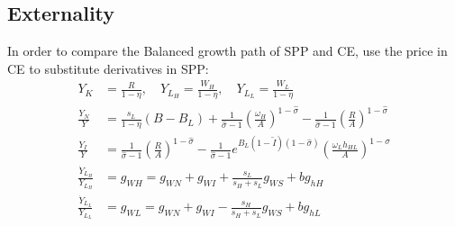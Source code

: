 \documentclass[12pt]{article}
\begin{document}
\subsection{Externality}
In order to compare the Balanced growth path of SPP and CE, use the price in CE to substitute derivatives in SPP: 
\begin{align*}
Y_K &= \frac{R}{1-\eta}, \quad Y_{L_H}= \frac{W_H}{1-\eta}, \quad Y_{L_L}= \frac{W_L}{1-\eta} \\
\frac{Y_{N}}{Y} &=\frac{s_L}{1-\eta}(B-B_L)+\frac{1}{\hat{\sigma}-1}(\frac{\omega_H}{A})^{1-\hat{\sigma}}-\frac{1}{\hat{\sigma}-1}(\frac{R}{A})^{1-\hat{\sigma}} \\
\frac{Y_{I}}{Y} &=\frac{1}{\hat{\sigma}-1}(\frac{R}{A})^{1-\hat{\sigma}}-\frac{1}{\hat{\sigma}-1}e^{B_L(1-\tilde{I})(1-\hat{\sigma})}(\frac{\omega_Lh_{HL}}{A})^{1-\hat{\sigma}} \\
\frac{\dot{Y}_{L_H}}{Y_{L_H}} &= g_{WH} = g_{WN}+g_{WI}+\frac{s_L}{s_H+s_L}g_{WS} +bg_{hH}\\
\frac{\dot{Y}_{L_L}}{Y_{L_L}} &= g_{WL} = g_{WN}+g_{WI}-\frac{s_H}{s_H+s_L}g_{WS} +bg_{hL}
\end{align*}
\end{document}
